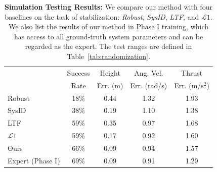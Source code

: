 \begin{table}[h]
\centering
\begin{tabular*}{0.45\textwidth}{@{}lcccc@{}}
\toprule
   & Success & Height  & Ang. Vel. &  Thrust \\ &Rate& Err. (m) &Err. (rad/s)  & Err. (m/s$^2$) \\%
\midrule
 Robust~\cite{peng2018sim,tobin2017domain} & 18\%& 0.44 & 1.32 & 1.93 \\ 
 SysID~\cite{SysID} & 38\%& 0.19 & 1.10 & 1.38\\
 LTF~\cite{LTF} & 59\% & 0.35 & 0.97 & 1.68 \\
 $\mathcal{L}1$~\cite{hanover2021performance} & 59\% & 0.17 & 0.92 & 1.60 \\
 Ours & 66\% & 0.09 & 0.94 & 1.57 \\
 \midrule
 Expert (Phase I) & 69\% & 0.09 & 0.91 & 1.29 \\
\bottomrule
\end{tabular*}
\caption{\label{tab:sim-metrics} \textbf{Simulation Testing Results:} We compare our method with four baselines on the task of stabilization: \emph{Robust}, \emph{SysID}, \emph{LTF}, and $\mathcal{L}1$. We also list the results of our method in Phase I training, which has access to all ground-truth system parameters and can be regarded as the expert. The test ranges are defined in Table~\ref{tab:randomization}.
}
\end{table}

